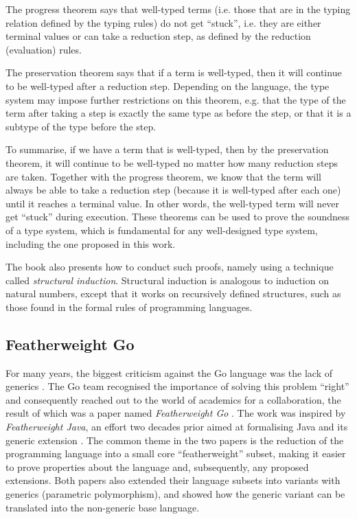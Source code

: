 The progress theorem says that well-typed terms (i.e. those that are in the
typing relation defined by the typing rules) do not get ``stuck'', i.e. they are
either terminal values or can take a reduction step, as defined by the reduction
(evaluation) rules.

The preservation theorem says that if a term is well-typed, then it will
continue to be well-typed after a reduction step. Depending on the language,
the type system may impose further restrictions on this theorem, e.g. that
the type of the term after taking a step is exactly the same type as before
the step, or that it is a subtype of the type before the step.

To summarise, if we have a term that is well-typed, then by the preservation
theorem, it will continue to be well-typed no matter how many reduction steps
are taken. Together with the progress theorem, we know that the term will always
be able to take a reduction step (because it is well-typed after each one) until
it reaches a terminal value. In other words, the well-typed term will never get
``stuck'' during execution. These theorems can be used to prove the soundness of
a type system, which is fundamental for any well-designed type system, including
the one proposed in this work.

The book also presents how to conduct such proofs, namely using a technique
called \emph{structural induction}. Structural induction is analogous to
induction on natural numbers, except that it works on recursively defined
structures, such as those found in the formal rules of programming languages.

\subsection{Featherweight Go}

For many years, the biggest criticism against the Go language was the lack of
generics \autocites{survey2021}{survey2020}{survey2019}. The Go team recognised
the importance of solving this problem ``right'' and consequently reached out to
the world of academics for a collaboration, the result of which was a paper
named \emph{Featherweight Go} \autocite{fg}. The work was inspired by
\emph{Featherweight Java}, an effort two decades prior aimed at formalising Java
and its generic extension \autocite{fj}. The common theme in the two papers is
the reduction of the programming language into a small core ``featherweight''
subset, making it easier to prove properties about the language and,
subsequently, any proposed extensions.
Both papers also extended their language subsets into variants with generics
(parametric polymorphism), and showed how the generic variant can be translated
into the non-generic base language.

